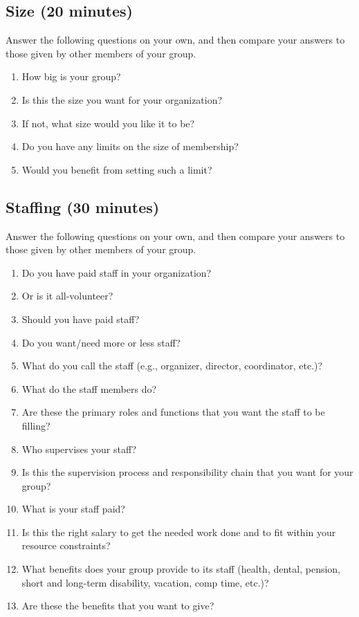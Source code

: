 \documentclass[10pt,statementpaper]{memoir}
\providecommand{\tightlist}{%
  \setlength{\itemsep}{0pt}\setlength{\parskip}{0pt}}
\begin{document}
\subsection*{Size (20 minutes)}\label{size-20-minutes}

Answer the following questions on your own, and then compare your
answers to those given by other members of your group.

\begin{enumerate}
\def\labelenumi{\arabic{enumi}.}
\tightlist
\item
  How big is your group?
\item
  Is this the size you want for your organization?
\item
  If not, what size would you like it to be?
\item
  Do you have any limits on the size of membership?
\item
  Would you benefit from setting such a limit?
\end{enumerate}

\subsection*{Staffing (30 minutes)}\label{staffing-30-minutes}

Answer the following questions on your own, and then compare your
answers to those given by other members of your group.

\begin{enumerate}
\def\labelenumi{\arabic{enumi}.}
\tightlist
\item
  Do you have paid staff in your organization?
\item
  Or is it all-volunteer?
\item
  Should you have paid staff?
\item
  Do you want/need more or less staff?
\item
  What do you call the staff (e.g., organizer, director, coordinator,
  etc.)?
\item
  What do the staff members do?
\item
  Are these the primary roles and functions that you want the staff to
  be filling?
\item
  Who supervises your staff?
\item
  Is this the supervision process and responsibility chain that you want
  for your group?
\item
  What is your staff paid?
\item
  Is this the right salary to get the needed work done and to fit within
  your resource constraints?
\item
  What benefits does your group provide to its staff (health, dental,
  pension, short and long-term disability, vacation, comp time, etc.)?
\item
  Are these the benefits that you want to give?
\end{enumerate}
\end{document}
